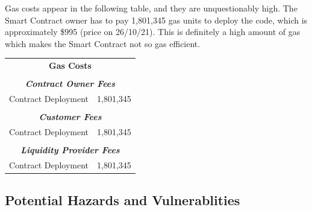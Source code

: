 \documentclass[12pt,a4paper]{article}
\begin{document}
Gas costs appear in the following table, and they are unquestionably high.
The Smart Contract owner has to pay 1,801,345 gas units to deploy the code, which is
approximately \$995 (price on 26/10/21). This is definitely a high amount of gas which makes the
Smart Contract not so gas efficient. \\

\begin{table}[htpb]
    \begin{center}
        \begin{tabular}{cc}
        \multicolumn{2}{c}{\textbf{Gas Costs}}                                                                                                                   \\
        \multicolumn{1}{l}{}                                     & \multicolumn{1}{l}{}                                            \\ \hline
        \multicolumn{2}{|c|}{\textit{\textbf{Contract Owner Fees}}}                                                                                              \\ \hline
        \multicolumn{1}{|c|}{Contract Deployment}                & \multicolumn{1}{c|}{1,801,345}                                                                    \\ \hline
        \multicolumn{1}{l}{}                                     & \multicolumn{1}{l}{}                                        \\ \hline
        \multicolumn{2}{|c|}{\textit{\textbf{Customer Fees}}} \\ \hline
        \multicolumn{1}{|c|}{Contract Deployment}                & \multicolumn{1}{c|}{1,801,345}                                                                    \\ \hline
        \multicolumn{1}{l}{}                                     & \multicolumn{1}{l}{}                                        \\ \hline
        \multicolumn{2}{|c|}{\textit{\textbf{Liquidity Provider Fees}}} \\ \hline   
        \multicolumn{1}{|c|}{Contract Deployment}                & \multicolumn{1}{c|}{1,801,345}                                                   \\ \hline
        \end{tabular}
    \end{center}
\end{table}

\subsection*{Potential Hazards and Vulnerablities}
\end{document}
